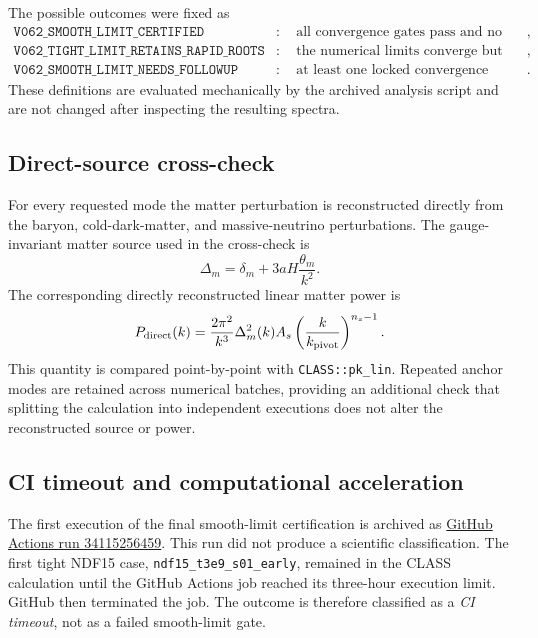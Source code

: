 The possible outcomes were fixed as
\begin{align}
\texttt{V062\_SMOOTH\_LIMIT\_CERTIFIED}&:\quad \text{all convergence gates pass and no final rapid roots remain},\\
\texttt{V062\_TIGHT\_LIMIT\_RETAINS\_RAPID\_ROOTS}&:\quad \text{the numerical limits converge but rapid roots remain},\\
\texttt{V062\_SMOOTH\_LIMIT\_NEEDS\_FOLLOWUP}&:\quad \text{at least one locked convergence requirement fails}.
\end{align}
These definitions are evaluated mechanically by the archived analysis script and are not changed after inspecting the resulting spectra.

\subsection{Direct-source cross-check}

For every requested mode the matter perturbation is reconstructed directly from the baryon, cold-dark-matter, and massive-neutrino perturbations. The gauge-invariant matter source used in the cross-check is
\begin{equation}
\Delta_m=\delta_m+3aH\frac{\theta_m}{k^2}.
\end{equation}
The corresponding directly reconstructed linear matter power is
\begin{equation}
P_{\rm direct}(k)=\frac{2\pi^2}{k^3}\Delta_m^2(k)A_s\left(\frac{k}{k_{\rm pivot}}\right)^{n_s-1}.
\end{equation}
This quantity is compared point-by-point with \texttt{CLASS::pk\_lin}. Repeated anchor modes are retained across numerical batches, providing an additional check that splitting the calculation into independent executions does not alter the reconstructed source or power.

\subsection{CI timeout and computational acceleration}
\label{sec:ci_acceleration}

The first execution of the final smooth-limit certification is archived as \href{https://github.com/dvlahek/aest-memory-gravity/actions/runs/34115256459}{GitHub Actions run 34115256459}. This run did not produce a scientific classification. The first tight NDF15 case, \texttt{ndf15\_t3e9\_s01\_early}, remained in the CLASS calculation until the GitHub Actions job reached its three-hour execution limit. GitHub then terminated the job. The outcome is therefore classified as a \emph{CI timeout}, not as a failed smooth-limit gate.

